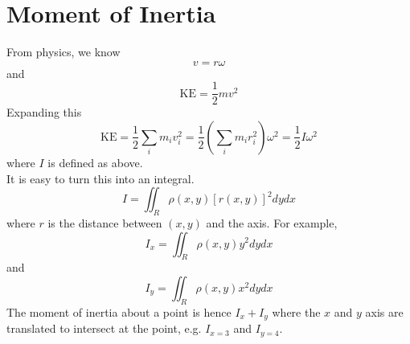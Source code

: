 \documentclass[12pt]{article}
\begin{document}
\section{Moment of Inertia}

From physics, we know $$v = r\omega$$ and $$\text{KE} = \frac{1}{2}mv^2$$
Expanding this
$$\text{KE} = \frac{1}{2} \sum_i m_iv_i^2 = \frac{1}{2} \left(\sum_i m_ir_i^2\right)\omega^2 = \frac{1}{2}I\omega^2$$
where $I$ is defined as above. \\
It is easy to turn this into an integral.
$$I = \iint_R \rho(x,y) [r(x,y)]^2 dydx$$
where $r$ is the distance between $(x,y)$ and the axis. For example,
$$I_x = \iint_R \rho(x,y) y^2 dydx$$
and
$$I_y = \iint_R \rho(x,y) x^2 dydx$$
The moment of inertia about a point is hence $I_x + I_y$ where the $x$ and $y$ axis are translated to intersect at the point, e.g. $I_{x=3}$ and $I_{y=4}$.
\end{document}
